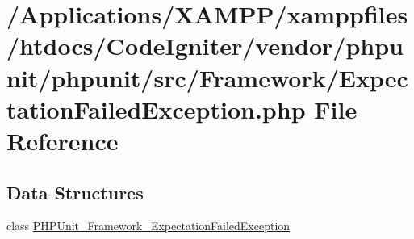 \hypertarget{_expectation_failed_exception_8php}{}\section{/\+Applications/\+X\+A\+M\+P\+P/xamppfiles/htdocs/\+Code\+Igniter/vendor/phpunit/phpunit/src/\+Framework/\+Expectation\+Failed\+Exception.php File Reference}
\label{_expectation_failed_exception_8php}
\subsection*{Data Structures}
\begin{DoxyCompactItemize}
\item 
class \mbox{\hyperlink{class_p_h_p_unit___framework___expectation_failed_exception}{P\+H\+P\+Unit\+\_\+\+Framework\+\_\+\+Expectation\+Failed\+Exception}}
\end{DoxyCompactItemize}
